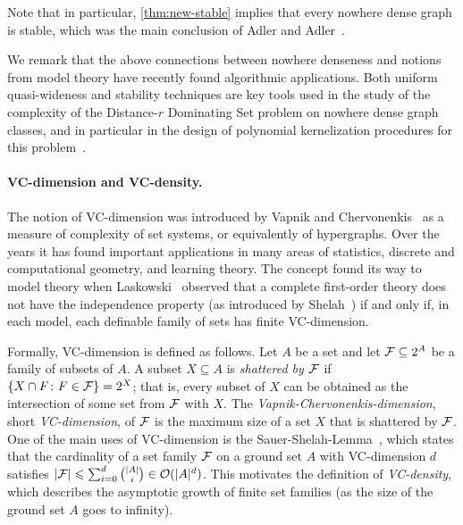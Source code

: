 Note that in particular, \cref{thm:new-stable} implies that every nowhere dense graph is stable, which was the main conclusion of Adler and Adler~\cite{adler2014interpreting}.

We remark that the above connections between nowhere denseness and notions from model theory have recently found algorithmic applications.
Both uniform quasi-wideness and stability techniques are key tools used in the study of the complexity of the {\sc Distance-$r$ Dominating Set} problem on nowhere dense graph classes,
and in particular in the design of polynomial kernelization procedures for this problem~\cite{DawarK09,drange2016kernelization,eickmeyer2016neighborhood,siebertz2016polynomial}.

\paragraph{VC-dimension and VC-density.} The notion of VC-dimension was introduced by 
Vapnik and Chervonenkis~\cite{chervonenkis1971theory} as a measure of complexity of set systems, or equivalently of hypergraphs.
Over the years it
has found important applications in many areas of
statistics, discrete and computational geometry, 
and learning theory. The concept found its way to
model theory when Laskowski~\cite{laskowski1992vapnik} 
observed that a complete first-order theory does not have
the independence property (as introduced by 
Shelah~\cite{shelah1971stability}) if and only if, 
in each model, each definable family of sets has finite 
VC-dimension.

Formally, VC-dimension is defined as follows. 
Let $A$ be a set and let  $\mathcal{F}\subseteq 2^A$ 
be a family of subsets of $A$.
A subset $X\subseteq A$ is \emph{shattered by $\mathcal{F}$} if
$\{X\cap F\colon F\in \mathcal{F}\}=2^X$; that is, every subset of $X$ can be obtained as the intersection of some set from $\mathcal{F}$ with $X$. 
The \emph{Vapnik-Chervonenkis-dimension}, short 
\emph{VC-dimension},
of $\mathcal{F}$ is the maximum size of a set $X$ that is shattered by
$\mathcal{F}$. One of the main uses of VC-dimension is the
Sauer-Shelah-Lemma~\cite{chervonenkis1971theory,sauer1972density, shelah1972combinatorial}, which states that the
cardinality of a set family $\mathcal{F}$ on a ground set $A$ 
with VC-dimension $d$ satisfies 
$\left\lvert\mathcal{F}\right\rvert\leqslant \sum_{i=0}^{d}\binom{|A|}{i}\in \mathcal{O}(|A|^d)$.
This motivates the definition of \emph{VC-density}, which
describes the asymptotic growth of finite set families
(as the size of the ground set $A$ goes to infinity). 
%


